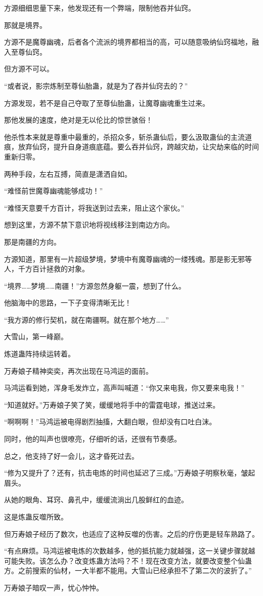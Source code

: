 \begin{this_body}
方源细细思量下来，他发现还有一个弊端，限制他吞并仙窍。

那就是境界。

方源不是魔尊幽魂，后者各个流派的境界都相当的高，可以随意吸纳仙窍福地，融入至尊仙窍。

但方源不可以。

“或者说，影宗炼制至尊仙胎蛊，就是为了吞并仙窍去的？”

方源发现，若不是自己夺取了至尊仙胎蛊，让魔尊幽魂重生过来。

那他发展的速度，绝对是无以伦比的惊世骇俗！

他杀性本来就是尊重中最重的，杀招众多，斩杀蛊仙后，要么汲取蛊仙的主流道痕，放弃仙窍，提升自身道痕底蕴。要么吞并仙窍，跨越灾劫，让灾劫来临的时间重新归零。

两种手段，左右互搏，简直是潇洒自如。

“难怪前世魔尊幽魂能够成功！”

“难怪天意要千方百计，将我送到过去来，阻止这个家伙。”

想到这里，方源不禁下意识地将视线移注到南边方向。

那是南疆的方向。

方源知道，那里有一片超级梦境，梦境中有魔尊幽魂的一缕残魂。那是影无邪等人，千方百计拯救的对象。

“境界……梦境……南疆！”方源忽然身躯一震，想到了什么。

他脑海中的思路，一下子变得清晰无比！

“我方源的修行契机，就在南疆啊。就在那个地方……”

大雪山，第一峰巅。

炼道蛊阵持续运转着。

万寿娘子精神奕奕，再次出现在马鸿运的面前。

马鸿运看到她，浑身毛发炸立，高声叫喊道：“你又来电我，你又要来电我！”

“知道就好。”万寿娘子笑了笑，缓缓地将手中的雷霆电球，推送过来。

“啊啊啊！”马鸿运被电得剧烈抽搐，大翻白眼，但却没有口吐白沫。

同时，他的叫声也很嘹亮，仔细听的话，还很有节奏感。

总之，他支持了好一会儿，这才昏死过去。

“修为又提升了？还有，抗击电炼的时间也延迟了三成。”万寿娘子明察秋毫，皱起眉头。

从她的眼角、耳窍、鼻孔中，缓缓流淌出几股鲜红的血迹。

这是炼蛊反噬所致。

但万寿娘子经历了数次，也适应了这种反噬的伤害。之后的疗伤更是轻车熟路了。

“有点麻烦。马鸿运被电炼的次数越多，他的抵抗能力就越强，这一关键步骤就越可能失败。该怎么办？改变炼蛊方法吗？不！现在改变方法，就要改变整个仙蛊方。之前搜索的仙材，一大半都不能用。大雪山已经承担不了第二次的波折了。”

万寿娘子暗叹一声，忧心忡忡。

\end{this_body}

